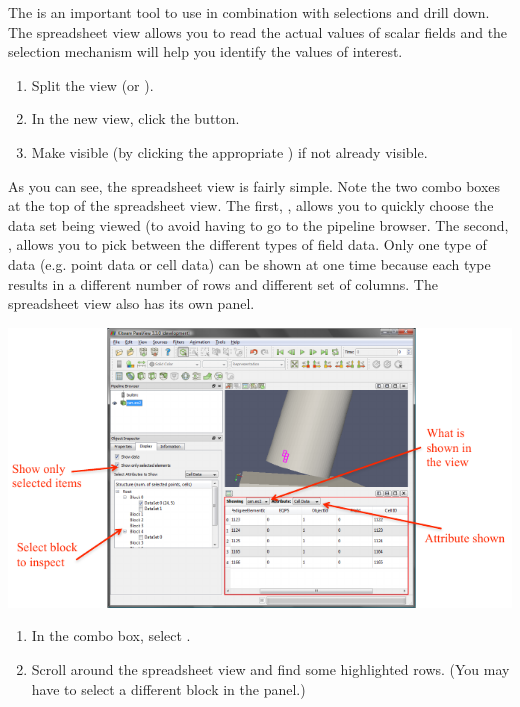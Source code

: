 The  is an important tool to use in combination
with selections and drill down.  The spreadsheet view allows you to read
the actual values of scalar fields and the selection mechanism will help
you identify the values of interest.

\begin{enumerate}
\item Split the view (\splitViewH or \splitViewV).
\item In the new view, click the  button.
\item Make  visible (by clicking the appropriate \eyeballg) if
  not already visible.
  \savecounter
\end{enumerate}

As you can see, the spreadsheet view is fairly simple.  Note the two combo
boxes at the top of the spreadsheet view.  The first, , allows
you to quickly choose the data set being viewed (to avoid having to go to
the pipeline browser.  The second, , allows you to pick
between the different types of field data.  Only one type of data
(e.g. point data or cell data) can be shown at one time because each type
results in a different number of rows and different set of columns.  The
spreadsheet view also has its own  panel.

\begin{inlinefig}
  \includegraphics{images/SpreadsheetViewLabeled}
\end{inlinefig}

\begin{enumerate}
  \restorecounter
\item In the  combo box, select .
\item Scroll around the spreadsheet view and find some highlighted rows.
  (You may have to select a different block in the  panel.)
  \savecounter
\end{enumerate}

